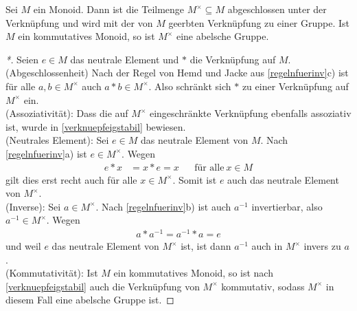 \begin{satz} \label{einheitengruppe}
    Sei $M$ ein Monoid. Dann ist die Teilmenge $M^\times\subseteq M$ abgeschlossen unter der Verknüpfung und wird mit der von $M$ geerbten Verknüpfung zu einer Gruppe. Ist $M$ ein kommutatives Monoid, so ist $M^\times$ eine abelsche Gruppe.
\end{satz}
\begin{proof}[*]
    Seien $e\in M$ das neutrale Element und $*$ die Verknüpfung auf $M$. \\[0.5em]
    (Abgeschlossenheit) Nach der Regel von Hemd und Jacke aus \cref{regelnfuerinv}c) ist für alle $a,b\in M^\times$ auch $a*b\in M^\times$. Also schränkt sich $*$ zu einer Verknüpfung auf $M^\times$ ein. \\[0.5em]
    (Assoziativität): Dass die auf $M^\times$ eingeschränkte Verknüpfung ebenfalls assoziativ ist, wurde in \cref{verknuepfeigstabil} bewiesen. \\[0.5em]
    (Neutrales Element): Sei $e\in M$ das neutrale Element von $M$. Nach \cref{regelnfuerinv}a) ist $e\in M^\times$. Wegen
    \begin{align*}
        e*x& =x*e=x && \text{für alle}\ x\in M
    \end{align*}
    gilt dies erst recht auch für alle $x\in M^\times$. Somit ist $e$ auch das neutrale Element von $M^\times$. \\[0.5em]
    (Inverse): Sei $a\in M^\times$. Nach \cref{regelnfuerinv}b) ist auch $a^{-1}$ invertierbar, also $a^{-1}\in M^\times$. Wegen
    \begin{align*}
        a*a^{-1}=a^{-1}*a=e
    \end{align*}
    und weil $e$ das neutrale Element von $M^\times$ ist, ist dann $a^{-1}$ auch in $M^\times$ invers zu $a$. \\[0.5em]
    (Kommutativität): Ist $M$ ein kommutatives Monoid, so ist nach \cref{verknuepfeigstabil} auch die Verknüpfung von $M^\times$ kommutativ, sodass $M^\times$ in diesem Fall eine abelsche Gruppe ist.
\end{proof}


